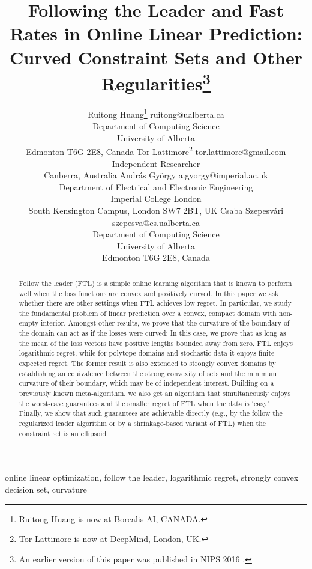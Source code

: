 \documentclass[english]{article}
\title{
Following the Leader and
Fast Rates in Online Linear Prediction:
Curved Constraint Sets and Other Regularities\thanks{An earlier version of this paper was published in NIPS 2016 \citep{HuLaGySz16}.}
}
\author{\name Ruitong Huang\thanks{Ruitong Huang is now at Borealis AI, CANADA.}  \email ruitong@ualberta.ca \\
  \addr Department of Computing Science\\
  University of Alberta\\
  Edmonton T6G 2E8, Canada 
 \AND
 \name Tor Lattimore\thanks{Tor Lattimore is now at DeepMind, London, UK.} \email tor.lattimore@gmail.com \\
 \addr Independent Researcher \\
 Canberra, Australia
  \AND
  \name Andr\'as Gy\"orgy \email  a.gyorgy@imperial.ac.uk\\
  \addr Department of Electrical and Electronic Engineering\\
  Imperial College London\\
  South Kensington Campus, London SW7 2BT, UK 
  \AND
  \name Csaba Szepesv\'ari \email szepesva@cs.ualberta.ca \\
  \addr Department of Computing Science\\
  University of Alberta\\
  Edmonton T6G 2E8, Canada
}
\begin{document}
\maketitle

\begin{abstract}%
Follow the leader (FTL) is a simple online learning algorithm that
is known to perform well when the loss functions are convex and positively curved.
In this paper we ask whether there are other settings when FTL achieves low regret.
In particular, we study the fundamental problem of linear prediction over a convex, compact domain with non-empty interior.
Amongst other results, we prove that the curvature of the boundary of the domain can act as if the losses
were curved: In this case, we prove that as long as 
the mean of the loss vectors have positive lengths bounded away from zero, 
FTL enjoys logarithmic regret, while for polytope domains and stochastic data it enjoys
finite expected regret.
The former result is also extended to strongly convex domains by establishing an equivalence between the strong convexity of sets and the minimum curvature of their boundary,
which may be of independent interest.
Building on a previously known meta-algorithm, we also get
an algorithm that simultaneously enjoys the worst-case guarantees and the smaller regret of FTL when the data is `easy'.
Finally, we show that such guarantees are achievable directly (e.g., by the follow the regularized leader algorithm or by a shrinkage-based variant of FTL)
when the constraint set is an ellipsoid.
\end{abstract}

\begin{keywords}
online linear optimization, follow the leader, logarithmic regret, strongly convex decision set, curvature
\end{keywords} 
\end{document}
